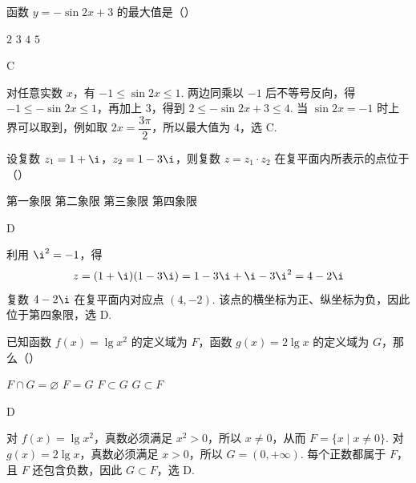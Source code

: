 \documentclass[UTF8,a4paper,oneside,11pt]{ctexbook}
\begin{document}
\begin{problem}

函数 \(y=-\sin 2x+3\) 的最大值是（\quad）

\choices
    {\(2\)}
    {\(3\)}
    {\(4\)}
    {\(5\)}

\begin{answer}
C
\end{answer}

\begin{solution}
对任意实数 \(x\)，有 \(-1\leqslant\sin 2x\leqslant1\). 两边同乘以 \(-1\) 后不等号反向，得 \(-1\leqslant-\sin 2x\leqslant1\)，再加上 \(3\)，得到 \(2\leqslant-\sin 2x+3\leqslant4\). 当 \(\sin 2x=-1\) 时上界可以取到，例如取 \(2x=\dfrac{3\pi}{2}\)，所以最大值为 \(4\)，选 C.
\end{solution}
\end{problem}

\begin{problem}

设复数 \(z_1=1+\i\)，\(z_2=1-3\i\)，则复数 \(z=z_1\cdot z_2\) 在复平面内所表示的点位于（\quad）

\choices
    {第一象限}
    {第二象限}
    {第三象限}
    {第四象限}

\begin{answer}
D
\end{answer}

\begin{solution}
利用 \(\i^2=-1\)，得
\[
z=(1+\i)(1-3\i)=1-3\i+\i-3\i^2=4-2\i
\]
复数 \(4-2\i\) 在复平面内对应点 \((4,-2)\). 该点的横坐标为正、纵坐标为负，因此位于第四象限，选 D.
\end{solution}
\end{problem}

\begin{problem}

已知函数 \(f(x)=\lg x^2\) 的定义域为 \(F\)，函数 \(g(x)=2\lg x\) 的定义域为 \(G\)，那么（\quad）

\choices
    {\(F \cap G = \varnothing\)}
    {\(F = G\)}
    {\(F \subset G\)}
    {\(G \subset F\)}

\begin{answer}
D
\end{answer}

\begin{solution}
对 \(f(x)=\lg x^2\)，真数必须满足 \(x^2>0\)，所以 \(x\neq0\)，从而 \(F=\{x\mid x\neq0\}\). 对 \(g(x)=2\lg x\)，真数必须满足 \(x>0\)，所以 \(G=(0,+\infty)\). 每个正数都属于 \(F\)，且 \(F\) 还包含负数，因此 \(G\subset F\)，选 D.
\end{solution}
\end{problem}
\end{document}
